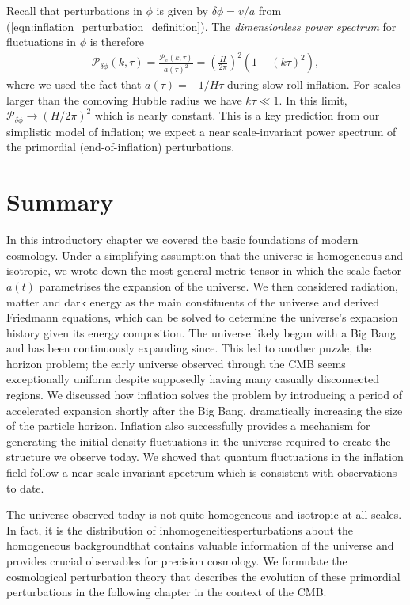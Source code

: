 Recall that perturbations in $\phi$ is given by $\delta\phi = v/a$ from (\ref{eqn:inflation_perturbation_definition}). The \textit{dimensionless power spectrum} for fluctuations in $\phi$ is therefore
\begin{align}
	\mathcal{P}_{\delta\phi} (k,\tau) = \frac{\mathcal{P}_v (k,\tau)}{a(\tau)^2} = \left( \frac{H}{2\pi} \right)^2 \left(1 + (k\tau)^2 \right),
\end{align}
where we used the fact that $a(\tau) = -1/H\tau$ during slow-roll inflation. For scales larger than the comoving Hubble radius we have $k\tau \ll 1$. In this limit, $\mathcal{P}_{\delta\phi} \rightarrow (H/2\pi)^2$ which is nearly constant. This is a key prediction from our simplistic model of inflation; we expect a near scale-invariant power spectrum of the primordial (end-of-inflation) perturbations.


\newpage
\section*{Summary}

In this introductory chapter we covered the basic foundations of modern cosmology. Under a simplifying assumption that the universe is homogeneous and isotropic, we wrote down the most general metric tensor in which the scale factor $a(t)$ parametrises the expansion of the universe. We then considered radiation, matter and dark energy as the main constituents of the universe and derived Friedmann equations, which can be solved to determine the universe's expansion history given its energy composition. The universe likely began with a Big Bang and has been continuously expanding since. This led to another puzzle, the horizon problem; the early universe observed through the CMB seems exceptionally uniform despite supposedly having many casually disconnected regions. We discussed how inflation solves the problem by introducing a period of accelerated expansion shortly after the Big Bang, dramatically increasing the size of the particle horizon. Inflation also successfully provides a mechanism for generating the initial density fluctuations in the universe required to create the structure we observe today. We showed that quantum fluctuations in the inflation field follow a near scale-invariant spectrum which is consistent with observations to date.

The universe observed today is not quite homogeneous and isotropic at all scales. In fact, it is the distribution of inhomogeneities\textemdash perturbations about the homogeneous background\textemdash that contains valuable information of the universe and provides crucial observables for precision cosmology. We formulate the cosmological perturbation theory that describes the evolution of these primordial perturbations in the following chapter in the context of the CMB.